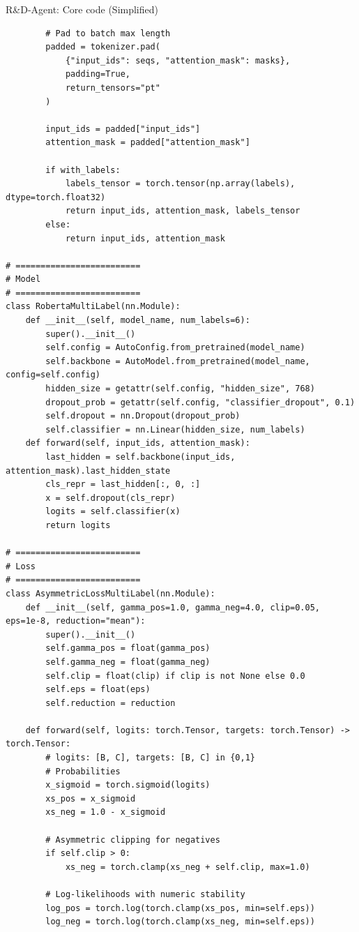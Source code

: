 \begin{codebox}{R\&D-Agent: Core code (Simplified)}
\begin{verbatim}
        # Pad to batch max length
        padded = tokenizer.pad(
            {"input_ids": seqs, "attention_mask": masks},
            padding=True,
            return_tensors="pt"
        )

        input_ids = padded["input_ids"]
        attention_mask = padded["attention_mask"]

        if with_labels:
            labels_tensor = torch.tensor(np.array(labels), dtype=torch.float32)
            return input_ids, attention_mask, labels_tensor
        else:
            return input_ids, attention_mask

# =========================
# Model
# =========================
class RobertaMultiLabel(nn.Module):
    def __init__(self, model_name, num_labels=6):
        super().__init__()
        self.config = AutoConfig.from_pretrained(model_name)
        self.backbone = AutoModel.from_pretrained(model_name, config=self.config)
        hidden_size = getattr(self.config, "hidden_size", 768)
        dropout_prob = getattr(self.config, "classifier_dropout", 0.1)
        self.dropout = nn.Dropout(dropout_prob)
        self.classifier = nn.Linear(hidden_size, num_labels)
    def forward(self, input_ids, attention_mask):
        last_hidden = self.backbone(input_ids, attention_mask).last_hidden_state
        cls_repr = last_hidden[:, 0, :]
        x = self.dropout(cls_repr)
        logits = self.classifier(x)
        return logits

# =========================
# Loss
# =========================
class AsymmetricLossMultiLabel(nn.Module):
    def __init__(self, gamma_pos=1.0, gamma_neg=4.0, clip=0.05, eps=1e-8, reduction="mean"):
        super().__init__()
        self.gamma_pos = float(gamma_pos)
        self.gamma_neg = float(gamma_neg)
        self.clip = float(clip) if clip is not None else 0.0
        self.eps = float(eps)
        self.reduction = reduction

    def forward(self, logits: torch.Tensor, targets: torch.Tensor) -> torch.Tensor:
        # logits: [B, C], targets: [B, C] in {0,1}
        # Probabilities
        x_sigmoid = torch.sigmoid(logits)
        xs_pos = x_sigmoid
        xs_neg = 1.0 - x_sigmoid

        # Asymmetric clipping for negatives
        if self.clip > 0:
            xs_neg = torch.clamp(xs_neg + self.clip, max=1.0)

        # Log-likelihoods with numeric stability
        log_pos = torch.log(torch.clamp(xs_pos, min=self.eps))
        log_neg = torch.log(torch.clamp(xs_neg, min=self.eps))


\end{verbatim}
\end{codebox}
